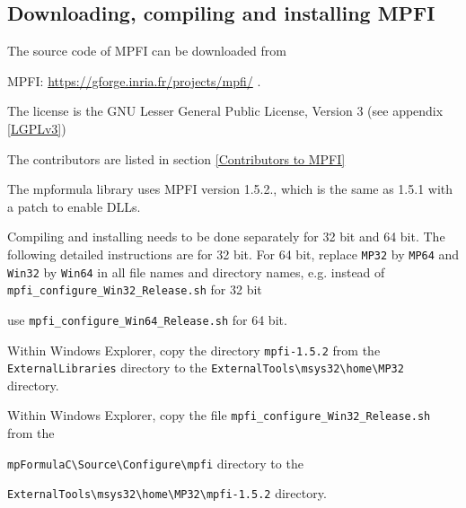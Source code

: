 \subsection{Downloading, compiling and installing MPFI}
The source code of MPFI can be downloaded from

MPFI: \href{https://gforge.inria.fr/projects/mpfi/}{https://gforge.inria.fr/projects/mpfi/} . 

The license is the GNU Lesser General Public License, Version 3 (see appendix \ref{LGPLv3})

The contributors are listed in section \ref{Contributors to MPFI}

The mpformula library uses MPFI version 1.5.2., which is the same as 1.5.1 with a patch to enable DLLs.


\vpara
Compiling and installing needs to be done separately for 32 bit and 64 bit. The following detailed instructions are for 32 bit. For 64 bit, replace \verb|MP32| by \verb|MP64| and \verb|Win32| by  \verb|Win64| in all file names and directory names, e.g. instead of \verb|mpfi_configure_Win32_Release.sh| for 32 bit

use \verb|mpfi_configure_Win64_Release.sh| for 64 bit.

\vpara
Within Windows Explorer, copy the directory \verb|mpfi-1.5.2|  from the \verb|ExternalLibraries|
directory to the \verb|ExternalTools\msys32\home\MP32| directory. 

\vpara
Within Windows Explorer, copy the file \verb|mpfi_configure_Win32_Release.sh|  from the

\verb|mpFormulaC\Source\Configure\mpfi| directory to the 

\verb|ExternalTools\msys32\home\MP32\mpfi-1.5.2| directory.  


